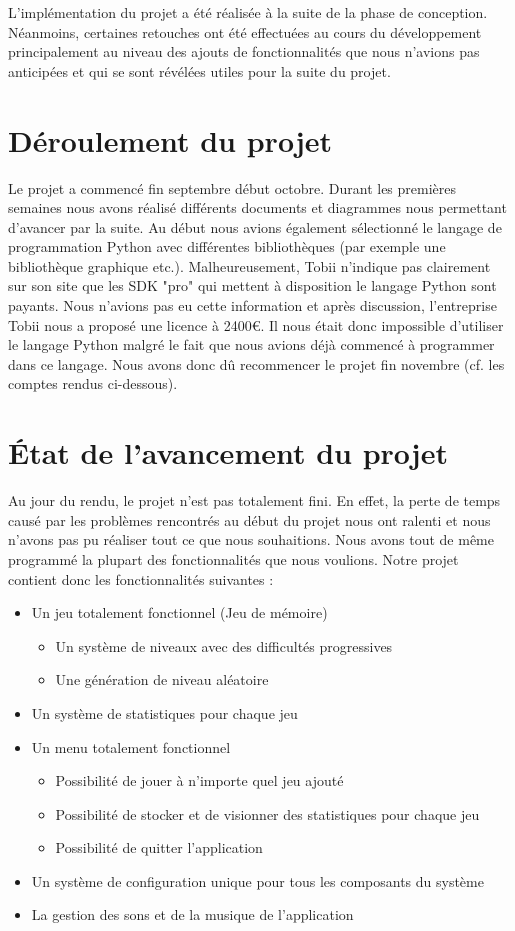 \documentclass{polytech/polytech}
\begin{document}
L'implémentation du projet a été réalisée à la suite de la phase de conception. Néanmoins, certaines retouches ont été effectuées au cours du développement principalement au niveau des ajouts de fonctionnalités que nous n'avions pas anticipées et qui se sont révélées utiles pour la suite du projet. 

\section{Déroulement du projet}
Le projet a commencé fin septembre début octobre. Durant les premières semaines nous avons réalisé différents documents et diagrammes nous permettant d'avancer par la suite. Au début nous avions également sélectionné le langage de programmation Python avec différentes bibliothèques (par exemple une bibliothèque graphique etc.). Malheureusement, Tobii n'indique pas clairement sur son site que les SDK "pro" qui mettent à disposition le langage Python sont payants. Nous n'avions pas eu cette information et après discussion, l'entreprise Tobii nous a proposé une licence à 2400€. Il nous était donc impossible d'utiliser le langage Python malgré le fait que nous avions déjà commencé à programmer dans ce langage. 
	Nous avons donc dû recommencer le projet fin novembre (cf. les comptes rendus ci-dessous). 
    
\section{État de l'avancement du projet}
Au jour du rendu, le projet n'est pas totalement fini. En effet, la perte de temps causé par les problèmes rencontrés au  début du projet nous ont ralenti et nous n'avons pas pu réaliser tout ce que nous souhaitions. Nous avons tout de même programmé la plupart des fonctionnalités que nous voulions. Notre projet contient donc les fonctionnalités suivantes :
\begin{itemize}
\item Un jeu totalement fonctionnel (Jeu de mémoire)
\begin{itemize}
\item Un système de niveaux avec des difficultés progressives
\item Une génération de niveau aléatoire
\end{itemize}
\item Un système de statistiques pour chaque jeu
\item Un menu totalement fonctionnel
\begin{itemize}
\item Possibilité de jouer à n'importe quel jeu ajouté
\item Possibilité de stocker et de visionner des statistiques pour chaque jeu
\item Possibilité de quitter l'application
\end{itemize}
\item Un système de configuration unique pour tous les composants du système
\item La gestion des sons et de la musique de l'application
\end{itemize}
\end{document}
